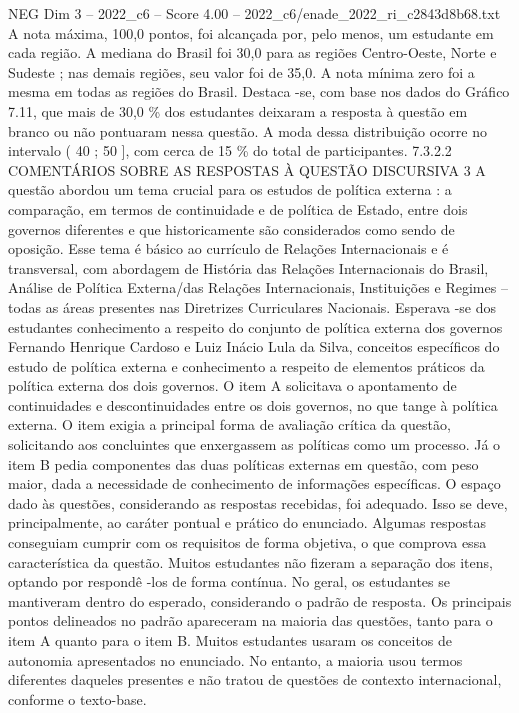 \begin{textsample}{NEG Dim 3 – 2022\_c6 – Score 4.00 – 2022\_c6/enade\_2022\_ri\_c2843d8b68.txt}
A nota máxima, 100,0 pontos, foi alcançada por, pelo menos, um estudante em cada região.
A mediana do Brasil foi 30,0 para as regiões Centro-Oeste, Norte e Sudeste ; nas demais regiões, seu valor foi de 35,0.
A nota mínima zero foi a mesma em todas as regiões do Brasil.
Destaca -se, com base nos dados do Gráfico 7.11, que mais de 30,0 \% dos estudantes deixaram a resposta à questão em branco ou não pontuaram nessa questão.
A moda dessa distribuição ocorre no intervalo ( 40 ; 50 ], com cerca de 15 \% do total de participantes. 7.3.2.2 COMENTÁRIOS SOBRE AS RESPOSTAS À QUESTÃO DISCURSIVA 3 A questão abordou um tema crucial para os estudos de política externa : a comparação, em termos de continuidade e de política de Estado, entre dois governos diferentes e que historicamente são considerados como sendo de oposição.
Esse tema é básico ao currículo de Relações Internacionais e é transversal, com abordagem de História das Relações Internacionais do Brasil, Análise de Política Externa/das Relações Internacionais, Instituições e Regimes – todas as áreas presentes nas Diretrizes Curriculares Nacionais.
Esperava -se dos estudantes conhecimento a respeito do conjunto de política externa dos governos Fernando Henrique Cardoso e Luiz Inácio Lula da Silva, conceitos específicos do estudo de política externa e conhecimento a respeito de elementos práticos da política externa dos dois governos.
O item A solicitava o apontamento de continuidades e descontinuidades entre os dois governos, no que tange à política externa.
O item exigia a principal forma de avaliação crítica da questão, solicitando aos concluintes que enxergassem as políticas como um processo.
Já o item B pedia componentes das duas políticas externas em questão, com peso maior, dada a necessidade de conhecimento de informações específicas.
O espaço dado às questões, considerando as respostas recebidas, foi adequado.
Isso se deve, principalmente, ao caráter pontual e prático do enunciado.
Algumas respostas conseguiam cumprir com os requisitos de forma objetiva, o que comprova essa característica da questão.
Muitos estudantes não fizeram a separação dos itens, optando por respondê -los de forma contínua.
No geral, os estudantes se mantiveram dentro do esperado, considerando o padrão de resposta.
Os principais pontos delineados no padrão apareceram na maioria das questões, tanto para o item A quanto para o item B.
Muitos estudantes usaram os conceitos de autonomia apresentados no enunciado.
No entanto, a maioria usou termos diferentes daqueles presentes e não tratou de questões de contexto internacional, conforme o texto-base.

\end{textsample}
